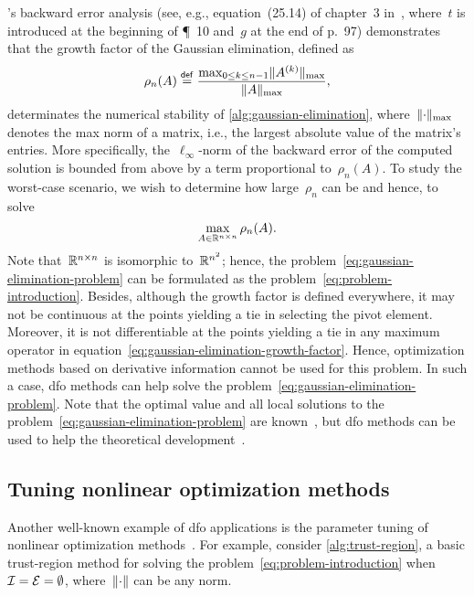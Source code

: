 's backward error analysis (see, e.g., equation~(25.14) of chapter~3 in~\cite{Wilkinson_1963}, where~$t$ is introduced at the beginning of \P~10 and~$g$ at the end of p.~97) demonstrates that the growth factor of the Gaussian elimination, defined as
\begin{equation}
    \label{eq:gaussian-elimination-growth-factor}
    \rho_n(A) \mathrel{\stackrel{\mathsf{def}}{=}} \frac{\max_{0 \le k \le n - 1} \lVert A^{(k)}\rVert_{\max}}{\lVert A\rVert_{\max}},
\end{equation}
determinates the numerical stability of \cref{alg:gaussian-elimination}, where~$\lVert\cdot\rVert_{\max}$ denotes the max norm of a matrix, i.e., the largest absolute value of the matrix's entries.
More specifically, the~$\ell_{\infty}$-norm of the backward error of the computed solution is bounded from above by a term proportional to~$\rho_n(A)$.
To study the worst-case scenario, we wish to determine how large~$\rho_n$ can be and hence, to solve
\begin{equation}
    \label{eq:gaussian-elimination-problem}
    \max_{A \in \mathbb{R}^{n \times n}} \rho_n(A).
\end{equation}
Note that~$\mathbb{R}^{n \times n}$ is isomorphic to~$\mathbb{R}^{n^2}$; hence, the problem~\cref{eq:gaussian-elimination-problem} can be formulated as the problem~\cref{eq:problem-introduction}.
Besides, although the growth factor is defined everywhere, it may not be continuous at the points yielding a tie in selecting the pivot element.
Moreover, it is not differentiable at the points yielding a tie in any maximum operator in equation~\cref{eq:gaussian-elimination-growth-factor}.
Hence, optimization methods based on derivative information cannot be used for this problem.
In such a case, \gls{dfo} methods can help solve the problem~\cref{eq:gaussian-elimination-problem}.
Note that the optimal value and all local solutions to the problem~\cref{eq:gaussian-elimination-problem} are known~\cite{Higham_Higham_1989}, but \gls{dfo} methods can be used to help the theoretical development~\cite{Higham_1993}.

\subsection{Tuning nonlinear optimization methods}
\label{subsec:tuning-nonlinear-optimization-methods}

Another well-known example of \gls{dfo} applications is the parameter tuning of nonlinear optimization methods~\cite{Audet_Orban_2006}.
For example, consider \cref{alg:trust-region}, a basic trust-region method for solving the problem~\cref{eq:problem-introduction} when~$\mathcal{I} = \mathcal{E} = \emptyset$, where~$\lVert\cdot\rVert$ can be any norm.

